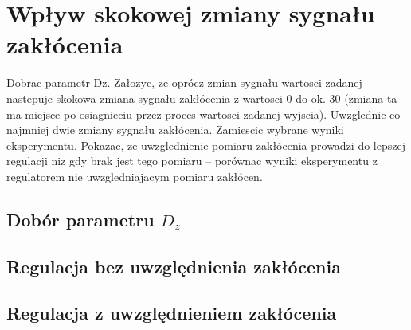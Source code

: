 \section{Wpływ skokowej zmiany sygnału zakłócenia}

Dobrac parametr Dz. Załozyc, ze oprócz zmian sygnału wartosci zadanej nastepuje
skokowa zmiana sygnału zakłócenia z wartosci 0 do ok. 30 (zmiana ta ma miejsce
po osiagnieciu przez proces wartosci zadanej wyjscia). Uwzglednic co najmniej
dwie zmiany sygnału zakłócenia. Zamiescic wybrane wyniki eksperymentu. Pokazac,
ze uwzglednienie pomiaru zakłócenia prowadzi do lepszej regulacji niz gdy brak jest
tego pomiaru – porównac wyniki eksperymentu z regulatorem nie uwzgledniajacym
pomiaru zakłócen.

\subsection{Dobór parametru $D_z$}

\subsection{Regulacja bez uwzględnienia zakłócenia}

\subsection{Regulacja z uwzględnieniem zakłócenia}
